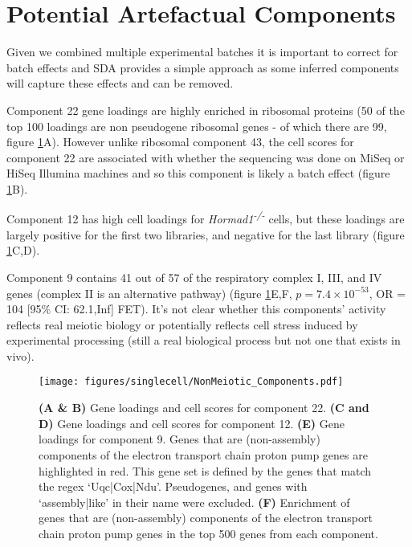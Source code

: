 \newpage
\section{Potential Artefactual Components}

Given we combined multiple experimental batches it is important to correct for batch effects and SDA provides a simple approach as some inferred components will capture these effects and can be removed.

Component 22 gene loadings are highly enriched in ribosomal proteins (50 of the top 100 loadings are non pseudogene ribosomal genes - of which there are 99, figure \ref{fig:NonMeiotic}A).
However unlike ribosomal component 43, the cell scores for component 22 are associated with whether the sequencing was done on MiSeq or HiSeq Illumina machines and so this component is likely a batch effect (figure \ref{fig:NonMeiotic}B).

Component 12 has high cell loadings for \textit{Hormad1\textsuperscript{-/-}} cells, but these loadings are largely positive for the first two libraries, and negative for the last library (figure \ref{fig:NonMeiotic}C,D).

Component 9 contains 41 out of 57 of the respiratory complex I, III, and IV genes (complex II is an alternative pathway) (figure \ref{fig:NonMeiotic}E,F, $p = 7.4\times10^{-53}$, OR = 104 [95\% CI: 62.1,Inf] FET).
It's not clear whether this components' activity reflects real meiotic biology or potentially reflects cell stress induced by experimental processing (still a real biological process but not one that exists in vivo).

\begin{figure}[H]
	\centering
	\texttt{[image: figures/singlecell/NonMeiotic\_Components.pdf]}
	\caption[Non Meiotic Components]{
		\textbf{(A \& B)} Gene loadings and cell scores for component 22.
		\textbf{(C and D)} Gene loadings and cell scores for component 12.
		\textbf{(E)} Gene loadings for component 9.
			Genes that are (non-assembly) components of the electron transport chain proton pump genes are highlighted in red.
			This gene set is defined by the genes that match the regex ‘Uqc|Cox|Ndu’.
			Pseudogenes, and genes with ‘assembly|like’ in their name were excluded.
		\textbf{(F)} Enrichment of genes that are (non-assembly) components of the electron transport chain proton pump genes in the top 500 genes from each component.
	}
	\label{fig:NonMeiotic}
\end{figure}


